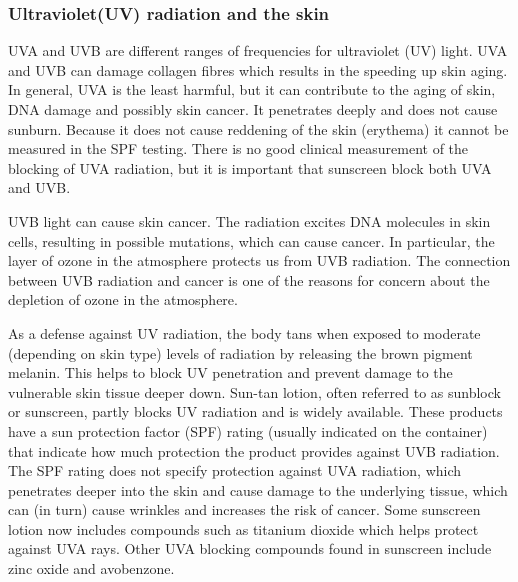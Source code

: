             \subsubsection{ Ultraviolet(UV) radiation and the skin}
            \nopagebreak
        \label{m38779*id189482}UVA and UVB are different ranges of frequencies for ultraviolet (UV) light. UVA and UVB can damage collagen fibres which results in the speeding up skin aging. In general, UVA is the least harmful, but it can contribute to the aging of skin, DNA damage and possibly skin cancer. It penetrates deeply and does not cause sunburn. Because it does not cause reddening of the skin (erythema) it cannot be measured in the SPF testing. There is no good clinical measurement of the blocking of UVA radiation, but it is important that sunscreen block both UVA and UVB.\par 
        \label{m38779*id189490}UVB light can cause skin cancer. The radiation excites DNA molecules in skin cells, resulting in possible mutations, which can cause cancer. In particular, the layer of ozone in the atmosphere protects us from UVB radiation. The connection between UVB radiation and cancer is one of the reasons for concern about the depletion of ozone in the atmosphere.\par 
        \label{m38779*id189495}As a defense against UV radiation, the body tans when exposed to moderate (depending on skin type) levels of radiation by releasing the brown pigment melanin. This helps to block UV penetration and prevent damage to the vulnerable skin tissue deeper down. Sun-tan lotion, often referred to as sunblock or sunscreen, partly blocks UV radiation and is widely available. These products have a sun protection factor (SPF) rating (usually indicated on the container) that indicate how much protection the product provides against UVB radiation. The SPF rating does not specify protection against UVA radiation, which penetrates deeper into the skin and cause damage to the underlying tissue, which can (in turn) cause wrinkles and increases the risk of cancer. Some sunscreen lotion now includes compounds such as titanium dioxide which helps protect against UVA rays. Other UVA blocking compounds found in sunscreen include zinc oxide and avobenzone.\par 
\label{m38779*secfhsst!!!underscore!!!id701}
